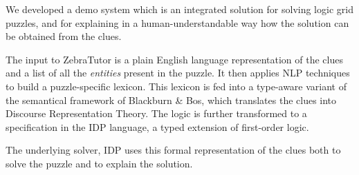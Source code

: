 We developed a demo system which is an integrated solution for solving logic grid puzzles, and for explaining in a human-understandable way how the solution can be obtained from the clues. 

The input to ZebraTutor is a plain English language representation of the clues and a list of all the \textit{entities} present in the puzzle. It then applies NLP techniques to build a puzzle-specific lexicon. This lexicon is fed into a type-aware variant of the semantical framework of Blackburn \& Bos, which translates the clues into Discourse Representation Theory. The logic is further transformed to a specification in the IDP language, a typed extension of first-order logic. 

The underlying solver, IDP\cite{pip:de2018predicate} uses this formal representation of the clues both to solve the puzzle and to explain the solution. 

